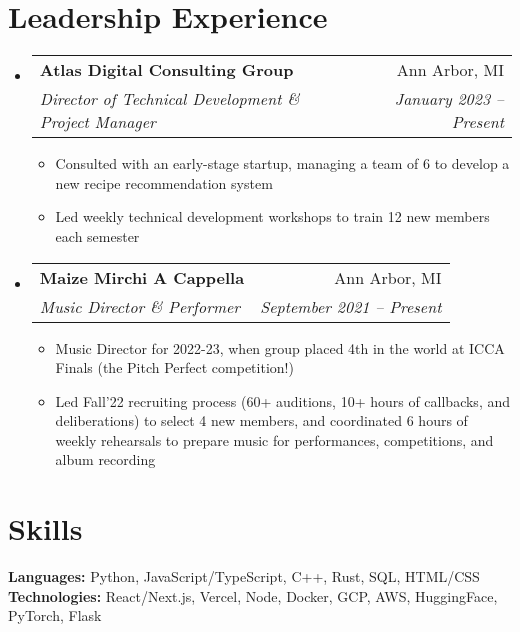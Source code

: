 \documentclass[letterpaper,11pt]{article}
\makeatletter
\newcommand{\resumeItem}[1]{
  \item\small{
    {#1 \vspace{-2pt}}
  }
}
\newcommand{\resumeSubheading}[4]{
  \vspace{-2pt}\item
    \begin{tabular*}{\textwidth}[t]{l@{\extracolsep{\fill}}r}
      \textbf{#1} & #2 \\
      \textit{\small#3} & \textit{\small #4} \\
    \end{tabular*}\vspace{-7pt}
}
\newcommand{\resumeProjectHeading}[2]{
    \item
    \begin{tabular*}{\textwidth}{l@{\extracolsep{\fill}}r}
      \small#1 & #2 \\
    \end{tabular*}\vspace{-7pt}
}
\newcommand{\resumeSubHeadingListStart}{\begin{itemize}[leftmargin=0in, label={}]}
\newcommand{\resumeSubHeadingListEnd}{\end{itemize}}
\newcommand{\resumeItemListStart}{\begin{itemize}[leftmargin=0.25in]}
\newcommand{\resumeItemListEnd}{\end{itemize}\vspace{-5pt}}
\newcommand{\mytexttilde}{\raisebox{0.5ex}{\texttildelow}}
\makeatother
\begin{document}
\section{Leadership Experience}
  \resumeSubHeadingListStart
    \resumeSubheading
      {Atlas Digital Consulting Group}{Ann Arbor, MI}
      {Director of Technical Development \& Project Manager}{January 2023 -- Present}
      \resumeItemListStart
        \resumeItem{Consulted with an early-stage startup, managing a team of 6 to develop a new recipe recommendation system}
        \resumeItem{Led weekly technical development workshops to train \mytexttilde 12 new members each semester}
    \resumeItemListEnd
  
    \resumeSubheading
      {Maize Mirchi A Cappella}{Ann Arbor, MI}
      {Music Director \& Performer}{September 2021 -- Present}
      \resumeItemListStart
        \resumeItem{Music Director for 2022-23, when group placed 4th in the world at ICCA Finals (the Pitch Perfect competition!)}
        \resumeItem{Led Fall’22 recruiting process (60+ auditions, 10+ hours of callbacks, and deliberations) to select 4 new members, and coordinated 6 hours of weekly rehearsals to prepare music for performances, competitions, and album recording}
      \resumeItemListEnd
  \resumeSubHeadingListEnd
  

\section{Skills}
 \begin{itemize}[leftmargin=0.15in, label={}]
    \small{\item{
     \textbf{Languages: }{Python, JavaScript/TypeScript, C++, Rust, SQL, HTML/CSS} \\
     \textbf{Technologies: }{React/Next.js, Vercel, Node, Docker, GCP, AWS, HuggingFace, PyTorch, Flask} \\
    }}
 \end{itemize}

\end{document}
